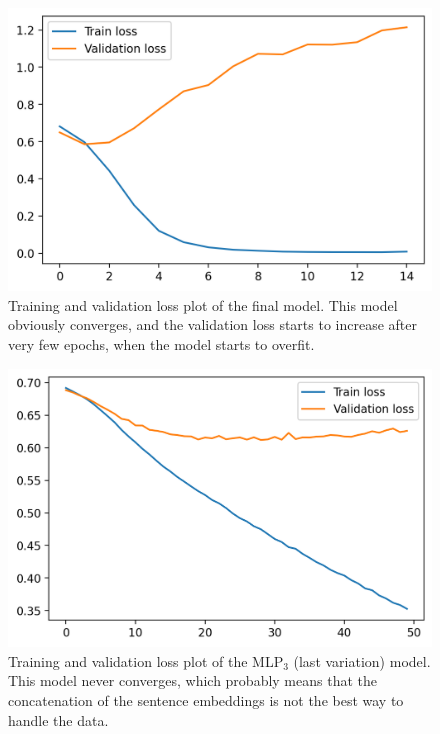 \documentclass[11pt,a4paper]{article}
\begin{document}
	\begin{figure}[H]
		\centering
		\includegraphics[width=1\columnwidth]{losses_final.png}
		\caption{Training and validation loss plot of the final model. This model obviously converges, and the validation loss starts to increase after very few epochs, when the model starts to overfit.}
		\label{fig:losses_final}
	\end{figure}

	\begin{figure}[H]
		\centering
		\includegraphics[width=1\columnwidth]{losses_mlp.png}
		\caption{Training and validation loss plot of the MLP$_3$ (last variation) model. This model never converges, which probably means that the concatenation of the sentence embeddings is not the best way to handle the data.}
		\label{fig:losses_mlp}
	\end{figure}
	
	
	
	
	
	
	
\end{document}
